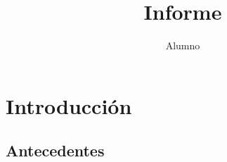 \documentclass[a5paper]{report}
\title{Informe}
\author{Alumno}
\begin{document}
\maketitle
\chapter{Introducci\'on}
\kant[1-6]

\section{Antecedentes}
\kant[6-10]
\end{document}
